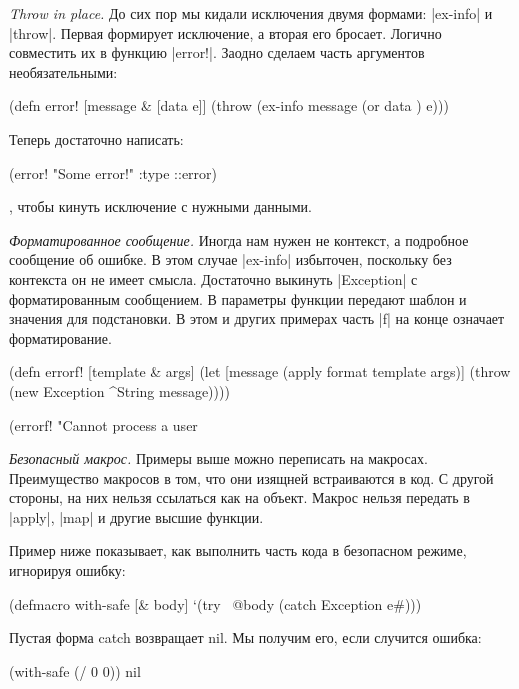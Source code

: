 \emph{Throw in place.} До сих пор мы кидали исключения двумя формами: \spverb|ex-info| и
\spverb|throw|. Первая формирует исключение, а вторая его бросает. Логично совместить
их в функцию \spverb|error!|. Заодно сделаем часть аргументов необязательными:

\begin{code}
(defn error!
  [message & [data e]]
  (throw (ex-info message (or data {}) e)))
\end{code}

Теперь достаточно написать:

\begin{code}
(error! "Some error!" {:type ::error})
\end{code}

, чтобы кинуть исключение с нужными данными.

\emph{Форматированное сообщение.} Иногда нам нужен не контекст, а подробное
сообщение об ошибке. В этом случае \spverb|ex-info| избыточен, поскольку без контекста
он не имеет смысла. Достаточно выкинуть \spverb|Exception| с форматированным
сообщением. В параметры функции передают шаблон и значения для подстановки. В
этом и других примерах часть \spverb|f| на конце означает форматирование.

\begin{code}
(defn errorf!
  [template & args]
  (let [message (apply format template args)]
    (throw (new Exception ^String message))))

(errorf! "Cannot process a user %
\end{code}

\emph{Безопасный макрос.} Примеры выше можно переписать на макросах. Преимущество
макросов в том, что они изящней встраиваются в код. С другой стороны, на них
нельзя ссылаться как на объект. Макрос нельзя передать в \spverb|apply|, \spverb|map| и другие
высшие функции.

Пример ниже показывает, как выполнить часть кода в безопасном режиме, игнорируя
ошибку:

\begin{code}
(defmacro with-safe
  [& body]
  `(try
     ~@body
     (catch Exception e#)))
\end{code}

Пустая форма catch возвращает nil. Мы получим его, если случится ошибка:

\begin{code}
(with-safe (/ 0 0))
nil
\end{code}

